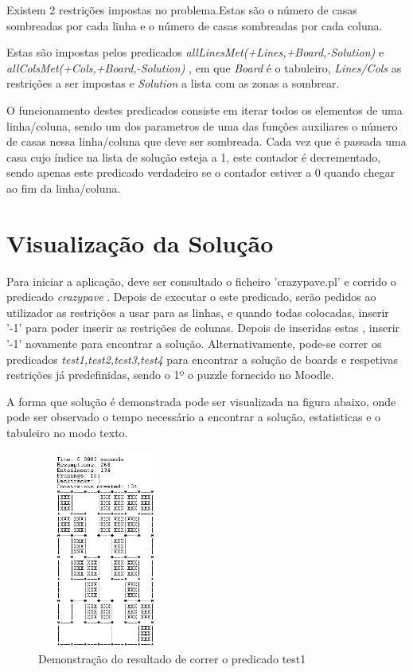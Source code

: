 \documentclass[runningheads,a4paper]{llncs}
\begin{document}
Existem 2 restrições impostas no problema.Estas são o número de casas sombreadas por cada linha e o número de casas sombreadas por cada coluna.

Estas são impostas pelos predicados \textit{allLinesMet(+Lines,+Board,-Solution)} e \textit{allColsMet(+Cols,+Board,-Solution)} , em que \textit{Board} é o tabuleiro, \textit{Lines/Cols} as restrições a ser impostas e \textit{Solution} a lista com as zonas a sombrear.

O funcionamento destes predicados consiste em iterar todos os elementos de uma linha/coluna, sendo um dos parametros de uma das funções auxiliares o número de casas nessa linha/coluna que deve ser sombreada.
Cada vez que é passada uma casa cujo índice na lista de solução esteja a 1, este contador é decrementado, sendo apenas este predicado verdadeiro se o contador estiver a 0 quando chegar ao fim da linha/coluna.


\section{Visualização da Solução}

Para iniciar a aplicação, deve ser consultado o ficheiro 'crazypave.pl' e corrido o predicado \textit{crazypave} .
Depois de executar o este predicado, serão pedidos ao utilizador as restrições a usar para as linhas, e quando todas colocadas, inserir '-1' para poder inserir as restrições de colunas.
Depois de inseridas estas , inserir '-1' novamente para encontrar a solução.
Alternativamente, pode-se correr os predicados \textit{test1,test2,test3,test4} para encontrar a solução de boards e respetivas restrições já predefinidas, sendo o 1º o puzzle fornecido no Moodle.

A forma que solução é demonstrada pode ser visualizada na figura abaixo, onde pode ser observado o tempo necessário a encontrar a solução, estatisticas e o tabuleiro no modo texto.



\begin{figure}
\centering
\includegraphics[height=6.5cm,width=4.5cm]{exemplo4.png}
\caption{Demonstração do resultado de correr o predicado test1} 
\label{fig:crazypavementexandsol}
\end{figure}
\end{document}
